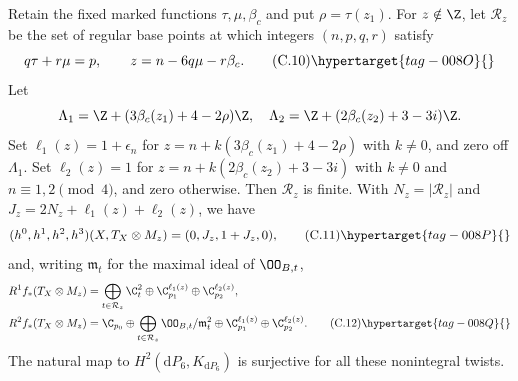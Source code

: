 
\begin{proposition}\hypertarget{tag-01FT}{}\label{cdp:st:C5c}


Retain the fixed marked functions $\tau,\mu,\beta_c$ and put $\rho=\tau(z_1)$. For $z\notin\Z$, let $\mathcal R_z$ be the set of regular base points at which integers $(n,p,q,r)$ satisfy
\[
 q\tau+r\mu=p,\qquad z=n-6q\mu-r\beta_c.               \tag{C.10}\hypertarget{tag-008O}{}\label{cdp:eq:C.10}
\]
Let
\[
 \Lambda_1=\Z+(3\beta_c(z_1)+4-2\rho)\Z,\quad
 \Lambda_2=\Z+(2\beta_c(z_2)+3-3i)\Z.
\]
Set $\ell_1(z)=1+\epsilon_n$ for $z=n+k(3\beta_c(z_1)+4-2\rho)$ with $k\ne0$, and zero off $\Lambda_1$. Set $\ell_2(z)=1$ for $z=n+k(2\beta_c(z_2)+3-3i)$ with $k\ne0$ and $n\equiv1,2\pmod4$, and zero otherwise. Then $\mathcal R_z$ is finite. With $N_z=|\mathcal R_z|$ and $J_z=2N_z+\ell_1(z)+\ell_2(z)$, we have
\[
 (h^0,h^1,h^2,h^3)(X,T_X\otimes M_z)=(0,J_z,1+J_z,0),  \tag{C.11}\hypertarget{tag-008P}{}\label{cdp:eq:C.11}
\]
and, writing $\mathfrak m_t$ for the maximal ideal of $\OO_{B,t}$,
\begin{align*}
R^1f_*(T_X\otimes M_z)&=
 \bigoplus_{t\in\mathcal R_z}\C_t^2
 \oplus\C_{p_1}^{\ell_1(z)}\oplus\C_{p_2}^{\ell_2(z)},\\
R^2f_*(T_X\otimes M_z)&=
 \C_{p_0}\oplus\bigoplus_{t\in\mathcal R_z}\OO_{B,t}/\mathfrak m_t^2
 \oplus\C_{p_1}^{\ell_1(z)}\oplus\C_{p_2}^{\ell_2(z)}.\tag{C.12}\hypertarget{tag-008Q}{}\label{cdp:eq:C.12}
\end{align*}
The natural map to $H^2(\mathrm dP_6,K_{\mathrm dP_6})$ is surjective for all these nonintegral twists.
\end{proposition}

